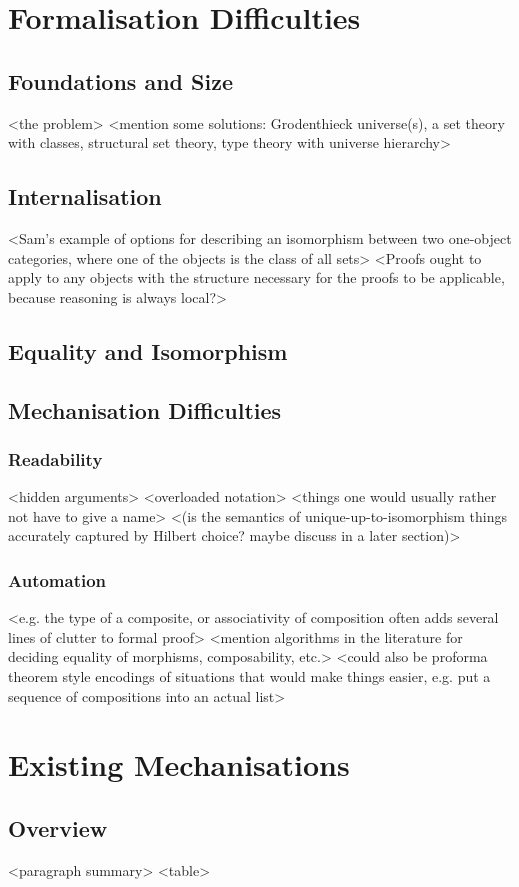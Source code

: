 \documentclass{article}
\begin{document}
\section{Formalisation Difficulties}
\subsection{Foundations and Size}
<the problem>
<mention some solutions: Grodenthieck universe(s), a set theory with classes, structural set theory, type theory with universe hierarchy>
\subsection{Internalisation}
<Sam's example of options for describing an isomorphism between two one-object categories, where one of the objects is the class of all sets>
<Proofs ought to apply to any objects with the structure necessary for the proofs to be applicable, because reasoning is always local?>
\subsection{Equality and Isomorphism}
\subsection{Mechanisation Difficulties}
\subsubsection{Readability}
<hidden arguments>
<overloaded notation>
<things one would usually rather not have to give a name>
<(is the semantics of unique-up-to-isomorphism things accurately captured by Hilbert choice? maybe discuss in a later section)>
\subsubsection{Automation}
<e.g. the type of a composite, or associativity of composition often adds several lines of clutter to formal proof>
<mention algorithms in the literature for deciding equality of morphisms, composability, etc.>
<could also be proforma theorem style encodings of situations that would make things easier, e.g. put a sequence of compositions into an actual list>
\section{Existing Mechanisations}
\subsection{Overview}
<paragraph summary>
<table>
\end{document}

